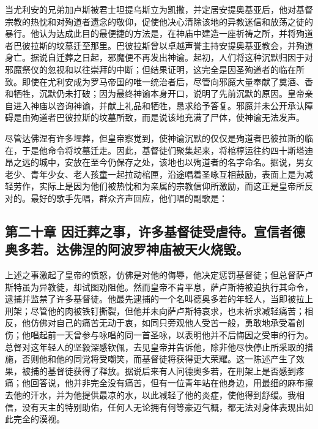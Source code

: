 当尤利安的兄弟加卢斯被君士坦提乌斯立为凯撒，并定居安提奥基亚后，他对基督宗教的热忱和对殉道者遗念的敬仰，促使他决心清除该地的异教迷信和放荡之徒的暴行。他认为达成此目的最便捷的方法是，在神庙中建造一座祈祷之所，并将殉道者巴彼拉斯的坟墓迁至那里。巴彼拉斯曾以卓越声誉主持安提奥基亚教会，并殉道身亡。据说自迁葬之日起，邪魔便不再发出神谕。起初，人们将这种沉默归因于对邪魔祭仪的忽视和以往崇拜的中断；但结果证明，这完全是因圣殉道者的临在所致。即使在尤利安成为罗马帝国的唯一统治者后，尽管向邪魔大量奉献了奠酒、香和牺牲，沉默仍未打破；因为最终神谕本身开口，说明了先前沉默的原因。皇帝亲自进入神庙以咨询神谕，并献上礼品和牺牲，恳求给予答复。邪魔并未公开承认障碍是由殉道者巴彼拉斯的坟墓所致，而是说该地充满了尸体，使神谕无法发声。\par

尽管达佛涅有许多埋葬，但皇帝察觉到，使神谕沉默的仅仅是殉道者巴彼拉斯的临在，于是他命令将坟墓迁走。因此，基督徒们聚集起来，将棺椁运往约四十斯塔迪昂之远的城中，安放在至今仍保存之处，该地也以殉道者的名字命名。据说，男女老少、青年少女、老人孩童一起拉动棺匣，沿途唱着圣咏互相鼓励，表面上是为减轻劳作，实际上是因为他们被热忱和为亲属的宗教信仰所激励，而这正是皇帝所反对的。最好的歌手先唱，群众齐声回应，他们唱的副歌是：\par


\subsection{第二十章  因迁葬之事，许多基督徒受虐待。宣信者德奥多若。达佛涅的阿波罗神庙被天火烧毁。}

上述之事激起了皇帝的愤怒，仿佛是对他的侮辱，他决定惩罚基督徒；但总督萨卢斯特虽为异教徒，却试图劝阻他。然而皇帝不肯平息，萨卢斯特被迫执行其命令，逮捕并监禁了许多基督徒。他最先逮捕的一个名叫德奥多若的年轻人，当即被拉上刑架；尽管他的肉被铁钉撕裂，但他并未向萨卢斯特哀求，也未祈求减轻痛苦；相反，他仿佛对自己的痛苦无动于衷，如同只旁观他人受苦一般，勇敢地承受着创伤；他唱起前一天曾参与咏唱的同一首圣咏，以表明他并不后悔因之受审的行为。总督对这年轻人的坚毅深感钦佩，去见皇帝并告诉他，除非他尽快停止所采取的措施，否则他和他的同党将受嘲笑，而基督徒将获得更大荣耀。这一陈述产生了效果，被捕的基督徒获得了释放。据说后来有人问德奥多若，在刑架上是否感到疼痛；他回答说，他并非完全没有痛苦，但有一位青年站在他身边，用最细的麻布擦去他的汗水，并为他提供最凉的水，以此减轻了他的炎症，使他得到舒缓。我相信，没有天主的特别助佑，任何人无论拥有何等豪迈气概，都无法对身体表现出如此完全的漠视。\par

